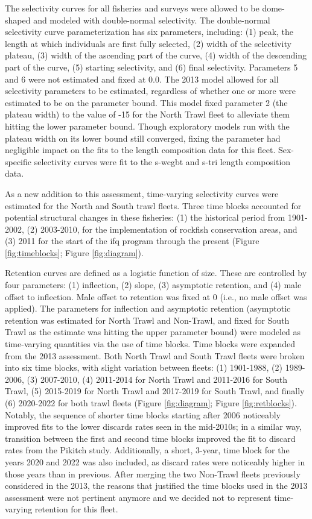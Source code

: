 \documentclass[11pt,
  letterpaper,
]{article}
\begin{document}
The selectivity curves for all fisheries and surveys were allowed to be dome-shaped and modeled with double-normal selectivity. The double-normal selectivity curve parameterization has six parameters, including: (1) peak, the length at which individuals are first fully selected, (2) width of the selectivity plateau, (3) width of the ascending part of the curve, (4) width of the descending part of the curve, (5) starting selectivity, and (6) final selectivity. Parameters 5 and 6 were not estimated and fixed at 0.0. The 2013 model allowed for all selectivity parameters to be estimated, regardless of whether one or more were estimated to be on the parameter bound. This model fixed parameter 2 (the plateau width) to the value of -15 for the North Trawl fleet to alleviate them hitting the lower parameter bound. Though exploratory models run with the plateau width on its lower bound still converged, fixing the parameter had negligible impact on the fits to the length composition data for this fleet. Sex-specific selectivity curves were fit to the \gls{s-wcgbt} and \gls{s-tri} length composition data.

As a new addition to this assessment, time-varying selectivity curves were estimated for the North and South trawl fleets. Three time blocks accounted for potential structural changes in these fisheries: (1) the historical period from 1901-2002, (2) 2003-2010, for the implementation of rockfish conservation areas, and (3) 2011 for the start of the \gls{ifq} program through the present (Figure \ref{fig:timeblocks}; Figure \ref{fig:diagram}).

Retention curves are defined as a logistic function of size. These are controlled by four parameters: (1) inflection, (2) slope, (3) asymptotic retention, and (4) male offset to inflection. Male offset to retention was fixed at 0 (i.e., no male offset was applied). The parameters for inflection and asymptotic retention (asymptotic retention was estimated for North Trawl and Non-Trawl, and fixed for South Trawl as the estimate was hitting the upper parameter bound) were modeled as time-varying quantities via the use of time blocks. Time blocks were expanded from the 2013 assessment. Both North Trawl and South Trawl fleets were broken into six time blocks, with slight variation between fleets: (1) 1901-1988, (2) 1989-2006, (3) 2007-2010, (4) 2011-2014 for North Trawl and 2011-2016 for South Trawl, (5) 2015-2019 for North Trawl and 2017-2019 for South Trawl, and finally (6) 2020-2022 for both trawl fleets (Figure \ref{fig:diagram}; Figure \ref{fig:retblocks}). Notably, the sequence of shorter time blocks starting after 2006 noticeably improved fits to the lower discards rates seen in the mid-2010s; in a similar way, transition between the first and second time blocks improved the fit to discard rates from the Pikitch study. Additionally, a short, 3-year, time block for the years 2020 and 2022 was also included, as discard rates were noticeably higher in those years than in previous. After merging the two Non-Trawl fleets previously considered in the 2013, the reasons that justified the time blocks used in the 2013 assessment were not pertinent anymore and we decided not to represent time-varying retention for this fleet.
\end{document}
